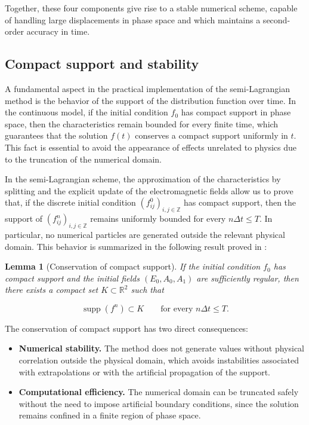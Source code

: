 \documentclass[11pt,a4paper,twoside,pdf]{article}
\numberwithin{equation}{section}
\newtheorem{lemma}[theorem]{Lemma}
\begin{document}
\medskip

Together, these four components give rise to a stable numerical scheme,
capable of handling large displacements in phase space and which maintains a
second-order accuracy in time.








\subsection{Compact support and stability}

A fundamental aspect in the practical implementation of the semi-Lagrangian method
is the behavior of the support of the distribution function over time.
In the continuous model, if the initial condition $f_0$ has compact support in
phase space, then the characteristics remain bounded for every finite
time, which guarantees that the solution $f(t)$ conserves a compact support
uniformly in $t$. This fact is essential to avoid the appearance of effects
unrelated to physics due to the truncation of the numerical domain.

In the semi-Lagrangian scheme, the approximation of
the characteristics by splitting and the explicit update of the electromagnetic
fields allow us to prove that, if the discrete initial condition
$(f^0_{ij})_{i,j\in\mathbb{Z}}$ has compact support, then the support of
$(f^n_{ij})_{i,j\in\mathbb{Z}}$ remains uniformly bounded for every
$n\Delta t\le T$. In particular, no numerical particles are generated outside the
relevant physical domain. This behavior is summarized in the following result proved in \cite{bostan2009convergence}:

\begin{lemma}[Conservation of compact support]
If the initial condition $f_0$ has compact support and the initial fields
$(E_0,A_0,A_1)$ are sufficiently regular, then there exists a compact set
$K\subset\mathbb{R}^2$ such that


\[
\operatorname{supp}(f^n)\subset K \qquad \text{for every } n\Delta t\le T.
\]


\end{lemma}

The conservation of compact support has two direct consequences:

\begin{itemize}
\item \textbf{Numerical stability.}
The method does not generate values without physical correlation outside the physical domain, which avoids
instabilities associated with extrapolations or with the artificial propagation of
the support.

\item \textbf{Computational efficiency.}
The numerical domain can be truncated safely without the need to impose
artificial boundary conditions, since the solution remains confined in
a finite region of phase space.
\end{itemize}
\end{document}
